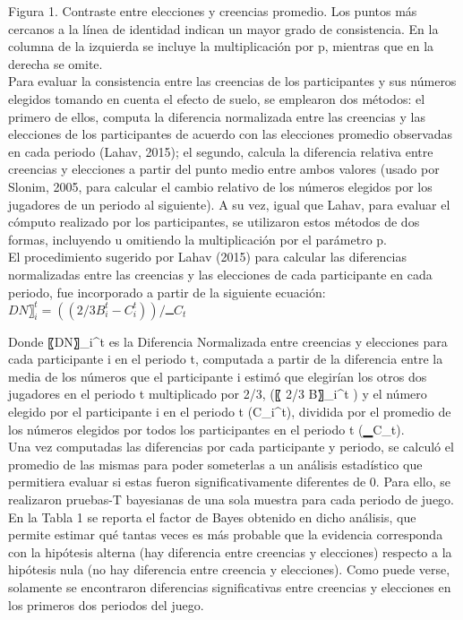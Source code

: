 Figura 1. Contraste entre elecciones y creencias promedio. Los puntos más cercanos a la línea de identidad indican un mayor grado de consistencia. En la columna de la izquierda se incluye la multiplicación por p, mientras que en la derecha se omite.\\

Para evaluar la consistencia entre las creencias de los participantes y sus números elegidos tomando en cuenta el efecto de suelo, se emplearon dos métodos: el primero de ellos, computa la diferencia normalizada entre las creencias y las elecciones de los participantes de acuerdo con las elecciones promedio observadas en cada periodo (Lahav, 2015); el segundo, calcula la diferencia relativa entre creencias y elecciones a partir del punto medio entre ambos valores (usado por Slonim, 2005, para calcular el cambio relativo de los números elegidos por los jugadores de un periodo al siguiente). A su vez, igual que Lahav, para evaluar el cómputo realizado por los participantes, se utilizaron estos métodos de dos formas,  incluyendo u omitiendo la multiplicación por el parámetro p.\\

El procedimiento sugerido por Lahav (2015) para calcular las diferencias normalizadas entre las creencias y las elecciones de cada participante en cada periodo, fue incorporado a partir de la siguiente ecuación:\\
$DN〗_i^t=  ((2/3 B_i^t- C_i^t))/▁C_t $

Donde 〖DN〗_i^t es la Diferencia Normalizada entre creencias y elecciones para cada participante i en el periodo t, computada a partir de la diferencia entre  la media de los números que el participante i estimó que elegirían los otros dos jugadores en el periodo t multiplicado por 2/3,  (〖 2/3 B〗_i^t  ) y el número elegido por el participante i en el periodo t (C_i^t), dividida por el promedio de los números elegidos por todos los participantes en el periodo t (▁C_t).\\

Una vez computadas las diferencias por cada participante y periodo, se calculó el promedio de las mismas para poder someterlas a un análisis estadístico que permitiera evaluar si estas fueron significativamente diferentes de 0. Para ello, se realizaron pruebas-T bayesianas de una sola muestra para cada periodo de juego. En la Tabla 1 se reporta el factor de Bayes obtenido en dicho análisis, que permite estimar qué tantas veces es más probable que la evidencia corresponda con la hipótesis alterna (hay diferencia entre creencias y elecciones) respecto a la hipótesis nula (no hay diferencia entre creencia y elecciones). Como puede verse, solamente se encontraron diferencias significativas entre creencias y elecciones en los primeros dos periodos del juego.\\

